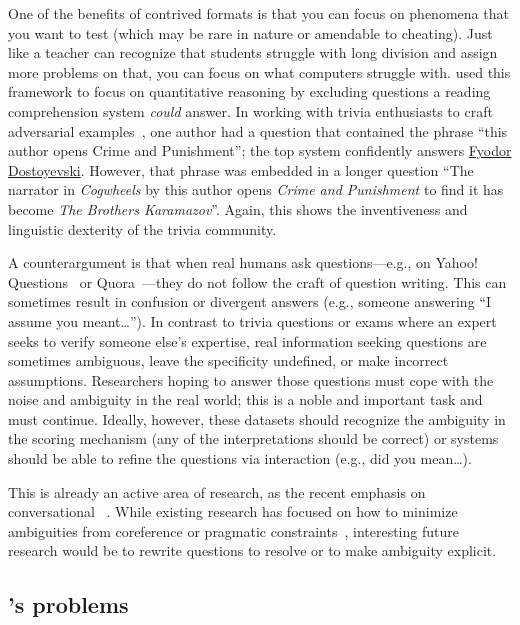 One of the benefits of contrived formats is that you can focus on phenomena that you want to test (which may be rare in nature or amendable to cheating). 
Just like a teacher can recognize that students struggle with long division and assign more problems on that, you can focus on what computers struggle with.
 used this framework to focus on quantitative reasoning by excluding questions a reading comprehension system \emph{could} answer.
In working with trivia enthusiasts to craft adversarial examples~\cite{wallace-19}, one author had a question that contained the phrase ``this author opens Crime and Punishment''; the top system confidently answers \underline{Fyodor Dostoyevski}.
However, that phrase was embedded in a longer question ``The narrator in \textit{Cogwheels} by this author opens \textit{Crime and Punishment} to find it has become \textit{The Brothers Karamazov}''. 
Again, this shows the inventiveness and linguistic dexterity of the trivia community.

A counterargument is that when real humans ask questions---e.g., on Yahoo! Questions~\cite{szpektor-13} or Quora~\cite{iyer-17}---they do not follow the craft of question writing.
This can sometimes result in confusion or divergent answers (e.g., someone answering ``I assume you meant\dots'').
In contrast to trivia questions or exams where an expert seeks to verify someone else's expertise, real information seeking questions  are sometimes ambiguous, leave the specificity undefined, or make incorrect assumptions.
Researchers hoping to answer those questions must cope with the noise and ambiguity in the real world; this is a noble and important task and must continue.
Ideally, however, these datasets should recognize the ambiguity in the scoring mechanism (any of the interpretations should be correct) or systems should be able to refine the questions via interaction (e.g., did you mean\dots).

This is already an active area of research, as the recent emphasis on conversational ~\cite{reddy-18,choi-18}.
While existing research has focused on how to minimize ambiguities from coreference or pragmatic constraints~\cite{elgohary-19}, interesting future research would be to rewrite questions to resolve or to make ambiguity explicit.


\subsection{\qb{}'s problems}

